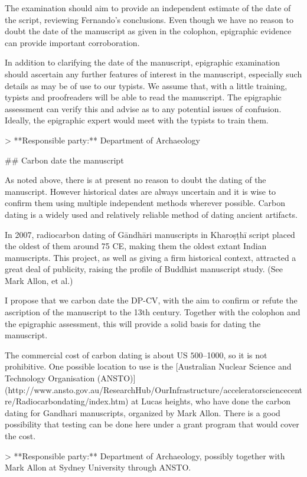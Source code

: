 \documentclass[11pt, openany,a5paper]{article}
\begin{document}
\begin{markdown}
The examination should aim to provide an independent estimate of the date of the script, reviewing Fernando’s conclusions. Even though we have no reason to doubt the date of the manuscript as given in the colophon, epigraphic evidence can provide important corroboration.

In addition to clarifying the date of the manuscript, epigraphic examination should ascertain any further features of interest in the manuscript, especially such details as may be of use to our typists. We assume that, with a little training, typists and proofreaders will be able to read the manuscript. The epigraphic assessment can verify this and advise as to any potential issues of confusion. Ideally, the epigraphic expert would meet with the typists to train them.

   > **Responsible party:** Department of Archaeology

## Carbon date the manuscript

As noted above, there is at present no reason to doubt the dating of the manuscript. However historical dates are always uncertain and it is wise to confirm them using multiple independent methods wherever possible. Carbon dating is a widely used and relatively reliable method of dating ancient artifacts.

In 2007, radiocarbon dating of Gāndhāri manuscripts in Kharoṣṭhī script placed the oldest of them around 75 CE, making them the oldest extant Indian manuscripts. This project, as well as giving a firm historical context, attracted a great deal of publicity, raising the profile of Buddhist manuscript study. (See Mark Allon, et al.)

I propose that we carbon date the DP-CV, with the aim to confirm or refute the ascription of the manuscript to the 13th century. Together with the colophon and the epigraphic assessment, this will provide a solid basis for dating the manuscript.

The commercial cost of carbon dating is about US $500–$1000, so it is not prohibitive. One possible location to use is the [Australian Nuclear Science and Technology Organisation (ANSTO)](http://www.ansto.gov.au/ResearchHub/OurInfrastructure/acceleratorsciencecentre/Radiocarbondating/index.htm) at Lucas heights, who have done the carbon dating for Gandhari manuscripts, organized by Mark Allon. There is a good possibility that testing can be done here under a grant program that would cover the cost.

   > **Responsible party:** Department of Archaeology, possibly together with Mark Allon at Sydney University through ANSTO.


\end{markdown}
\end{document}
